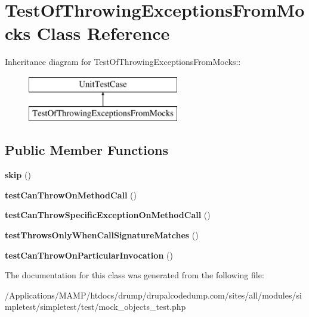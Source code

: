 \hypertarget{class_test_of_throwing_exceptions_from_mocks}{
\section{TestOfThrowingExceptionsFromMocks Class Reference}
\label{class_test_of_throwing_exceptions_from_mocks}
}
Inheritance diagram for TestOfThrowingExceptionsFromMocks::\begin{figure}[H]
\begin{center}
\leavevmode
\includegraphics[height=2cm]{class_test_of_throwing_exceptions_from_mocks}
\end{center}
\end{figure}
\subsection*{Public Member Functions}
\begin{DoxyCompactItemize}
\item 
\hypertarget{class_test_of_throwing_exceptions_from_mocks_ae3138711e9cc9244f6916c2e8d281534}{
{\bfseries skip} ()}
\label{class_test_of_throwing_exceptions_from_mocks_ae3138711e9cc9244f6916c2e8d281534}

\item 
\hypertarget{class_test_of_throwing_exceptions_from_mocks_afdbb6ddd1f057ab4330b3e8c25bb9f8d}{
{\bfseries testCanThrowOnMethodCall} ()}
\label{class_test_of_throwing_exceptions_from_mocks_afdbb6ddd1f057ab4330b3e8c25bb9f8d}

\item 
\hypertarget{class_test_of_throwing_exceptions_from_mocks_aa4c8452df73b012856d6196be884ea20}{
{\bfseries testCanThrowSpecificExceptionOnMethodCall} ()}
\label{class_test_of_throwing_exceptions_from_mocks_aa4c8452df73b012856d6196be884ea20}

\item 
\hypertarget{class_test_of_throwing_exceptions_from_mocks_ab4143c87bfa2755d9436918df2523318}{
{\bfseries testThrowsOnlyWhenCallSignatureMatches} ()}
\label{class_test_of_throwing_exceptions_from_mocks_ab4143c87bfa2755d9436918df2523318}

\item 
\hypertarget{class_test_of_throwing_exceptions_from_mocks_aa98d83c03f449f8c7ccbdd8dc714576d}{
{\bfseries testCanThrowOnParticularInvocation} ()}
\label{class_test_of_throwing_exceptions_from_mocks_aa98d83c03f449f8c7ccbdd8dc714576d}

\end{DoxyCompactItemize}


The documentation for this class was generated from the following file:\begin{DoxyCompactItemize}
\item 
/Applications/MAMP/htdocs/drump/drupalcodedump.com/sites/all/modules/simpletest/simpletest/test/mock\_\-objects\_\-test.php\end{DoxyCompactItemize}
